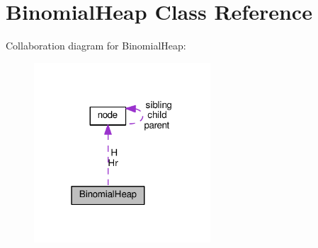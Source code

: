 \hypertarget{classBinomialHeap}{}\section{Binomial\+Heap Class Reference}
\label{classBinomialHeap}


Collaboration diagram for Binomial\+Heap\+:
\nopagebreak
\begin{figure}[H]
\begin{center}
\leavevmode
\includegraphics[width=187pt]{classBinomialHeap__coll__graph}
\end{center}
\end{figure}
